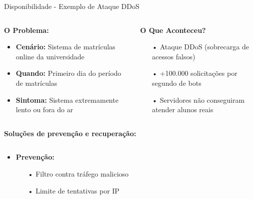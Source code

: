 \begin{frame}{Disponibilidade - Exemplo de Ataque DDoS}
    \begin{columns}[T]
        \begin{column}{0.48\textwidth}
            \begin{block}{\textbf{O Problema:}}
                \begin{itemize}
                    \item \textbf{Cenário:} Sistema de matrículas online da universidade
                    \item \textbf{Quando:} Primeiro dia do período de matrículas
                    \item \textbf{Sintoma:} Sistema extremamente lento ou fora do ar
                \end{itemize}
            \end{block}
        \end{column}

        \begin{column}{0.48\textwidth}
            \begin{exampleblock}{\textbf{O Que Aconteceu?}}
                \begin{itemize}
                    \item[•] Ataque DDoS (sobrecarga de acessos falsos)
                    \item[•] +100.000 solicitações por segundo de bots
                    \item[•] Servidores não conseguiram atender alunos reais
                \end{itemize}
            \end{exampleblock}
        \end{column}
    \end{columns}

    \begin{block}{\textbf{Soluções de prevenção e recuperação:}}
        \begin{columns}
            \begin{column}{0.5\textwidth}
                \begin{itemize}
                    \item \textbf{Prevenção:}
                          \begin{itemize}
                              \item[•] Filtro contra tráfego malicioso
                              \item[•] Limite de tentativas por IP
                          \end{itemize}
                \end{itemize}


\end{column}
\end{columns}
\end{block}
\end{frame}
